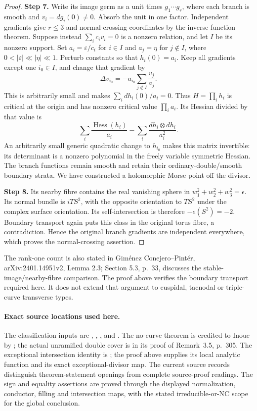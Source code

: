 \begin{proof}
\noindent\textbf{Step 7.} Write its image germ as a unit times $g_1\cdots g_r$, where
each branch is smooth and $v_i=dg_i(0)\ne0$. Absorb the
unit in one factor. Independent gradients give $r\leq3$
and normal-crossing coordinates by the inverse function
theorem. Suppose instead $\sum_i c_iv_i=0$ is a nonzero
relation, and let $I$ be its nonzero support. Set
$a_i=\varepsilon/c_i$ for $i\in I$ and $a_j=\eta$ for
$j\notin I$, where $0<|\varepsilon|\ll|\eta|\ll1$.
Perturb constants so that $h_i(0)=a_i$. Keep all gradients
except one $i_0\in I$, and change that gradient by
\[
 \Delta v_{i_0}=-a_{i_0}\sum_{j\notin I}\frac{v_j}{a_j}.
\]
This is arbitrarily small and makes $\sum_i dh_i(0)/a_i=0$.
Thus $H=\prod_i h_i$ is critical at the origin and has
nonzero critical value $\prod_i a_i$. Its Hessian divided
by that value is
\[
 \sum_i\frac{\operatorname{Hess}(h_i)}{a_i}
 -\sum_i\frac{dh_i\otimes dh_i}{a_i^2}.
\]
An arbitrarily small generic quadratic change to $h_{i_0}$
makes this matrix invertible: its determinant is a nonzero
polynomial in the freely variable symmetric Hessian.
The branch functions remain smooth and retain their
ordinary-double/smooth boundary strata. We have constructed
a holomorphic Morse point off the divisor.

\noindent\textbf{Step 8.} Its nearby fibre contains the real vanishing sphere in
$w_1^2+w_2^2+w_3^2=\epsilon$. Its normal bundle is
$iTS^2$, with the opposite orientation to $TS^2$ under the
complex surface orientation. Its self-intersection is
therefore $-e(S^2)=-2$. Boundary transport again puts this
class in the original torus fibre, a contradiction. Hence
the original branch gradients are independent everywhere,
which proves the normal-crossing assertion.
\end{proof}

The rank-one count is also stated in Gim\'enez Conejero--Pint\'er,
arXiv:2401.14951v2, Lemma 2.3; Section 5.3, p.~33,
discusses the stable-image/nearby-fibre comparison.
The proof above verifies the boundary transport required here.
It does not extend that argument to cuspidal, tacnodal or
triple-curve transverse types.

\paragraph{Exact source locations used here.}
The classification inputs are \cite[Chapter~VI, Theorem~1.1 and
Table~10, pp.~243--244]{BHPV2004E},
\cite[Theorems~4.2 and~5.1, with proofs, pp.~17--21 and~27--29]{OVV2020},
\cite[Theorem~1, p.~1]{BBK2019}, and
\cite[Theorem~2.1]{Catanese2004}.
The no-curve theorem is credited to Inoue by
\cite[Theorem~3.1, p.~303]{KhaledTeleman2026Journal}; the actual
unramified double cover is in its proof of Remark~3.5, p.~305.
The exceptional intersection identity is
\cite[\S I, p.~6]{Mumford1961}; the proof above supplies its
local analytic function and its exact exceptional-divisor map.
The current source records distinguish theorem-statement openings
from complete source-proof readings. The sign and equality assertions
are proved through the displayed normalization, conductor, filling
and intersection maps, with the stated irreducible-or-NC scope for
the global conclusion.

